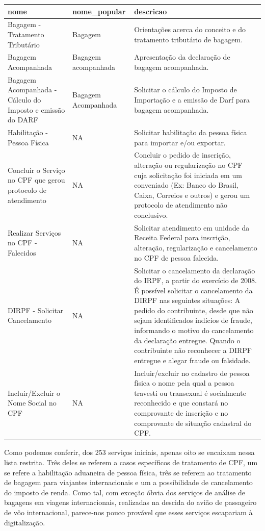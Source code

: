 \documentclass[]{article}
\begin{document}
\begin{table}[H]
\centering
\begin{tabular}{l|l|l}
\hline
nome & nome\_popular & descricao\\
\hline
Bagagem - Tratamento Tributário & Bagagem & Orientações acerca do conceito e do tratamento tributário de bagagem.\\
\hline
Bagagem Acompanhada & Bagagem acompanhada & Apresentação da declaração de bagagem acompanhada.\\
\hline
Bagagem Acompanhada - Cálculo do Imposto e emissão do DARF & Bagagem Acompanhada & Solicitar o cálculo do Imposto de Importação e a emissão de Darf para bagagem acompanhada.\\
\hline
Habilitação - Pessoa Física & NA & Solicitar habilitação da pessoa física para importar e/ou exportar.\\
\hline
Concluir o Serviço no CPF que gerou protocolo de atendimento & NA & Concluir o pedido de inscrição, alteração ou regularização no CPF cuja solicitação foi iniciada em um conveniado (Ex: Banco do Brasil, Caixa, Correios e outros) e gerou um protocolo de atendimento não conclusivo.\\
\hline
Realizar Serviços no CPF - Falecidos & NA & Solicitar atendimento em unidade da Receita Federal para inscrição, alteração, regularização e cancelamento no CPF de pessoa falecida.\\
\hline
DIRPF - Solicitar Cancelamento & NA & Solicitar o cancelamento da declaração do IRPF, a partir do exercício de 2008.
É possível solicitar o cancelamento da DIRPF nas seguintes situações:
A pedido do contribuinte, desde que não sejam identificados indícios de fraude, informando o motivo do cancelamento da declaração entregue.
Quando o contribuinte não reconhecer a DIRPF entregue e alegar fraude ou falsidade.\\
\hline
Incluir/Excluir o Nome Social no CPF & NA & Incluir/excluir no cadastro de pessoa física o nome pela qual a pessoa travesti ou transexual é socialmente reconhecido e que constará no comprovante de inscrição e no comprovante de situação cadastral do CPF.\\
\hline
\end{tabular}
\end{table}

Como podemos conferir, dos 253 serviços iniciais, apenas oito se
encaixam nessa lista restrita. Três deles se referem a casos específicos
de tratamento de CPF, um se refere a habilitação aduaneira de pessoa
física, três se referem ao tratamento de bagagem para viajantes
internacionais e um a possibilidade de cancelamento do imposto de renda.
Como tal, com exceção óbvia dos serviços de análise de bagagens em
viagens internacionais, realizadas na descida do avião de passageiro de
vôo internacional, parece-nos pouco provável que esses serviços
escapariam à digitalização.
\end{document}
